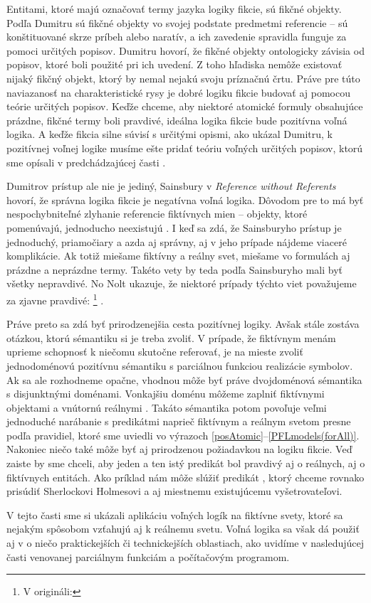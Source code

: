 \documentclass[12pt, letterpaper]{article}
\begin{document}
Entitami, ktoré majú označovať termy jazyka logiky fikcie, sú fikčné objekty. Podľa Dumitru sú fikčné objekty vo svojej podstate predmetmi referencie -- sú konštituované skrze príbeh alebo naratív, a ich zavedenie spravidla funguje za pomoci určitých popisov. Dumitru hovorí, že fikčné objekty ontologicky závisia od popisov, ktoré boli použité pri ich uvedení. Z toho hľadiska nemôže existovať nijaký fikčný objekt, ktorý by nemal nejakú svoju príznačnú črtu. Práve pre túto naviazanosť na charakteristické rysy je dobré logiku fikcie budovať aj pomocou teórie určitých popisov. Keďže chceme, aby niektoré atomické formuly obsahujúce prázdne, fikčné termy boli pravdivé, ideálna logika fikcie bude pozitívna voľná logika. A keďže fikcia silne súvisí s určitými opismi, ako ukázal Dumitru, k pozitívnej voľnej logike musíme ešte pridať teóriu voľných určitých popisov, ktorú sme opísali v predchádzajúcej časti \parencites[151--152, 154]{Dumitru2015}.\par
Dumitrov prístup ale nie je jediný, Sainsbury v \textit{Reference without Referents} hovorí, že správna logika fikcie je negatívna voľná logika. Dôvodom pre to má byť nespochybniteľné zlyhanie referencie fiktívnych mien -- objekty, ktoré pomenúvajú, jednoducho neexistujú \parencites[69]{Sainsbury2005}.  I keď sa zdá, že Sainsburyho prístup je jednoduchý, priamočiary a azda aj správny, aj v jeho prípade nájdeme viaceré komplikácie. Ak totiž miešame fiktívny a reálny svet, miešame vo formulách aj prázdne a neprázdne termy. Takéto vety by teda podľa Sainsburyho mali byť všetky nepravdivé. No Nolt ukazuje, že niektoré prípady týchto viet považujeme za zjavne pravdivé: \footnote{V origináli: } \parencites[vlastný preklad,][]{sep-logic-free}.\par
Práve preto sa zdá byť prirodzenejšia cesta pozitívnej logiky. Avšak stále zostáva otázkou, ktorú sémantiku si je treba zvoliť. V prípade, že fiktívnym menám uprieme schopnosť k niečomu skutočne referovať, je na mieste zvoliť jednodoménovú pozitívnu sémantiku s parciálnou funkciou realizácie symbolov. Ak sa ale rozhodneme opačne, vhodnou môže byť práve dvojdoménová sémantika s disjunktnými doménami. Vonkajšiu doménu môžeme zaplniť fiktívnymi objektami a vnútornú reálnymi \parencites[]{sep-logic-free}. Takáto sémantika potom povoľuje veľmi jednoduché narábanie s predikátmi naprieč fiktívnym a reálnym svetom presne podľa pravidiel, ktoré sme uviedli vo výrazoch \ref{posAtomic}--\ref{PFLmodels(forAll)}. Nakoniec niečo také môže byť aj prirodzenou požiadavkou na logiku fikcie. Veď zaiste by sme chceli, aby jeden a ten istý predikát bol pravdivý aj o reálnych, aj o fiktívnych entitách. Ako príklad nám môže slúžiť predikát , ktorý chceme rovnako prisúdiť Sherlockovi Holmesovi a aj miestnemu existujúcemu vyšetrovateľovi.\par
V tejto časti sme si ukázali aplikáciu voľných logík na fiktívne svety, ktoré sa nejakým spôsobom vzťahujú aj k reálnemu svetu. Voľná logika sa však dá použiť aj v o niečo praktickejších či technickejších oblastiach, ako uvidíme v nasledujúcej časti venovanej parciálnym funkciám a počítačovým programom.
\end{document}
